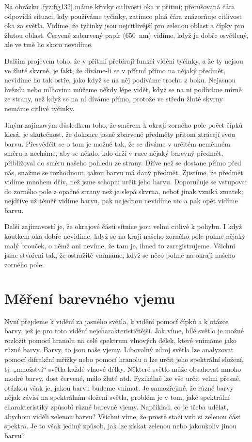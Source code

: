 {    Na obrázku \ref{fyz:fig132} máme křivky citlivosti oka v přítmí; přerušovaná čára odpovídá 
    situaci, kdy používáme tyčinky, zatímco plná čára znázorňuje citlivost oka za světla. Vidíme, 
    že tyčinky jsou nejcitlivější pro zelenou oblast a čípky pro žlutou oblast. Červeně zabarvený 
    papír (\SI{650}{\nm}) vidíme, když je dobře osvětlený, ale ve tmě ho skoro nevidíme.
    
    Dalším projevem toho, že v přítmí přebírají funkci vidění tyčinky, a že ty nejsou ve žluté 
    skvrně, je fakt, že díváme-li se v přítmí přímo na nějaký předmět, nevidíme ho tak ostře, jako 
    když se na něj podíváme trochu z boku. Nejasnou hvězdu nebo mlhovinu můžeme někdy lépe vidět, 
    když se na ni podíváme mírně ze strany, než když se na ní díváme přímo, protože ve středu žluté 
    skvrny nemáme citlivé tyčinky.
    
    Jiným zajímavým důsledkem toho, že směrem k okraji zorného pole počet čípků klesá, je 
    skutečnost, že dokonce jasně zbarvené předměty přitom ztrácejí svou barvu. Přesvědčit se o tom 
    je možné tak, že se díváme v určitém neměnném směru a necháme, aby se někdo, kdo drží v ruce 
    nějaký barevný předmět, přibližoval do směru našeho pohledu ze strany. Dříve než se dostane 
    přímo před nás, snažme se rozhodnout, jakou barvu má daný předmět. Zjistíme, že předmět vidíme 
    mnohem dřív, než jsme schopni určit jeho barvu. Doporučuje se vstupovat do zorného pole z 
    opačné strany než je slepá skvrna, neboť jinak vzniká zmatek; nejdříve už téměř vidíme barvu, 
    pak najednou nevidíme nic a pak opět vidíme barvu.
    
    Další zajímavostí je, že okrajové části sítnice jsou velmi citlivé k pohybu. I když koutkem oka 
    dobře nevidíme, když se na kraji našeho zorného pole pohne nějaký malý brouček, o němž ani 
    nevíme, že tam je, ihned to zaregistrujeme. Všichni jsme stvořeni tak, že ostražitě vnímáme, 
    když se něco pohne na okraji našeho zorného pole.
    
  \section{Měření barevného vjemu}\label{fyz:IchapXXXVsecIII}
    Nyní přejdeme k vidění za jasného světla, k vidění pomocí čípků a k otázce barvy, jež je pro 
    toto vidění nejcharakterističtější. Jak víme, bílé světlo je možné rozložit pomocí hranolu na 
    celé spektrum vlnových délek, které vnímáme jako různé barvy. Barvy, to jsou naše vjemy. 
    Libovolný zdroj světla lze analyzovat pomocí difrakční mřížky nebo pomocí hranolu a lze určit 
    jeho spektrální složení, tj. „množství“ světla každé vlnové délky. Některé světlo může 
    obsahovat mnoho modré barvy, dost červené, málo žluté atd. Fyzikálně lze vše určit velmi 
    přesně, otázkou však je, jakou barvu budeme vnímat. Je samozřejmé, že různé barvy nějak závisí 
    na spektrálním složení světla, problém je v tom, jaké spektrální charakteristiky způsobí různé 
    barevné vjemy. Například, co je třeba udělat, abychom viděli zelenou barvu? Všichni víme, že 
    prostě stačí vzít si zelenou část spektra. Je to však jediný způsob, jak lze získat zelenou 
    nebo jakoukoliv jinou barvu?
    
}
